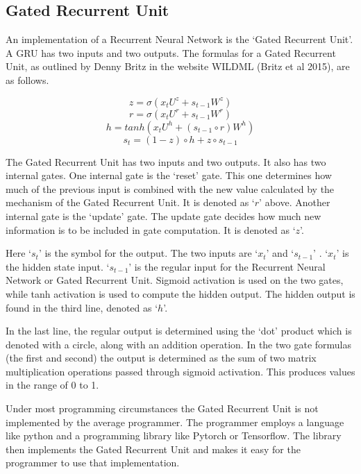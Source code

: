 \subsection*{Gated Recurrent Unit}
An implementation of a Recurrent Neural Network is the `Gated Recurrent Unit'. A \ac{GRU} has two inputs and two outputs. The formulas for a Gated Recurrent Unit, as outlined by Denny Britz in the website WILDML (Britz et al 2015)\cite{2015Britz}, are as follows.

\begin{minipage}{5in}

$$ z =\sigma(x_tU^z + s_{t-1} W^z) $$  
$$ r =\sigma(x_t U^r +s_{t-1} W^r) $$  
$$ h = tanh(x_t U^h + (s_{t-1} \circ r) W^h) $$  
$$ s_t = (1 - z) \circ h + z \circ s_{t-1} $$  

\end{minipage}

\bigskip \bigskip

The Gated Recurrent Unit has two inputs and two outputs. It also has two internal gates. One internal gate is the `reset' gate. This one determines how much of the previous input is combined with the new value calculated by the mechanism of the Gated Recurrent Unit. It is denoted as `$r$' above. Another internal gate is the `update' gate. The update gate decides how much new information is to be included in gate computation. It is denoted as `$z$'.

Here `$ s_t $' is the symbol for the output. The two inputs are `$ x_t $' and `$ s_{t-1} $' . `$ x_t $' is the hidden state input. `$ s_{t-1} $' is the regular input for the Recurrent Neural Network or Gated Recurrent Unit. Sigmoid activation is used on the two gates, while tanh activation is used to compute the hidden output. The hidden output is found in the third line, denoted as `$h$'.

In the last line, the regular output is determined using the `dot' product which is denoted with a circle, along with an addition operation. In the two gate formulas (the first and second) the output is determined as the sum of two matrix multiplication operations passed through sigmoid activation. This produces values in the range of 0 to 1.

Under most programming circumstances the Gated Recurrent Unit is not implemented by the average programmer. The programmer employs a language like python and a programming library like Pytorch or Tensorflow. The library then implements the Gated Recurrent Unit and makes it easy for the programmer to use that implementation.

